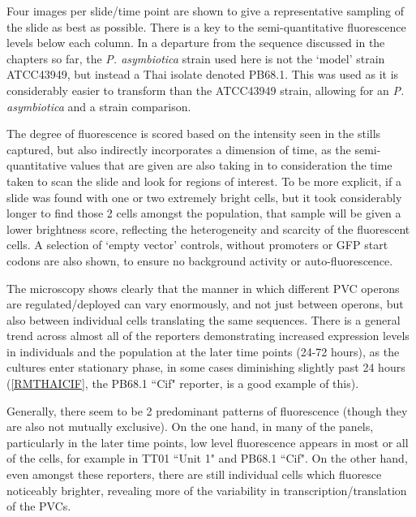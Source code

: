 Four images per slide/time point are shown to give a representative sampling of the slide as best as possible. There is a key to the semi-quantitative fluorescence levels below each column. In a departure from the sequence discussed in the chapters so far, the \emph{P. asymbiotica} strain used here is not the `model' strain ATCC43949, but instead a Thai isolate denoted PB68.1. This was used as it is considerably easier to transform than the ATCC43949 strain, allowing for an \emph{P. asymbiotica} and a \Plum{} strain comparison.

The degree of fluorescence is scored based on the intensity seen in the stills captured, but also indirectly incorporates a dimension of time, as the semi-quantitative values that are given are also taking in to consideration the time taken to scan the slide and look for regions of interest. To be more explicit, if a slide was found with one or two extremely bright cells, but it took considerably longer to find those 2 cells amongst the population, that sample will be given a lower brightness score, reflecting the heterogeneity and scarcity of the fluorescent cells. A selection of `empty vector' controls, without promoters or GFP start codons are also shown, to ensure no background activity or auto-fluorescence.


\clearpage

The microscopy shows clearly that the manner in which different PVC operons are regulated/deployed can vary enormously, and not just between operons, but also between individual cells translating the same sequences. There is a general trend across almost all of the reporters demonstrating increased expression levels in individuals and the population at the later time points (24-72 hours), as the cultures enter stationary phase, in some cases diminishing slightly past 24 hours (\vref{RMTHAICIF}, the PB68.1 ``Cif" reporter, is a good example of this).

Generally, there seem to be 2 predominant patterns of fluorescence (though they are also not mutually exclusive). On the one hand, in many of the panels, particularly in the later time points, low level fluorescence appears in most or all of the cells, for example in \Plum{} TT01 ``Unit 1" and \Pasy{} PB68.1 ``Cif". On the other hand, even amongst these reporters, there are still individual cells which fluoresce noticeably brighter, revealing more of the variability in transcription/translation of the PVCs.

